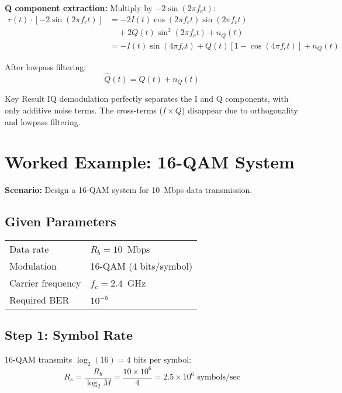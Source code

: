 \textbf{Q component extraction:} Multiply by $-2\sin(2\pi f_c t)$:
\begin{equation}
\begin{aligned}
r(t) \cdot [-2\sin(2\pi f_c t)] &= -2I(t)\cos(2\pi f_c t)\sin(2\pi f_c t) \\
&\quad + 2Q(t)\sin^2(2\pi f_c t) + n_Q(t) \\
&= -I(t)\sin(4\pi f_c t) + Q(t)[1 - \cos(4\pi f_c t)] + n_Q(t)
\end{aligned}
\end{equation}

After lowpass filtering:
\begin{equation}
\hat{Q}(t) = Q(t) + n_Q(t)
\end{equation}

\begin{calloutbox}{Key Result}
IQ demodulation perfectly separates the I and Q components, with only additive noise terms. The cross-terms ($I \times Q$) disappear due to orthogonality and lowpass filtering.
\end{calloutbox}

\section{Worked Example: 16-QAM System}

\textbf{Scenario:} Design a 16-QAM system for 10~Mbps data transmission.

\subsection*{Given Parameters}

\begin{tabular}{@{}ll@{}}
Data rate & $R_b = 10$~Mbps \\
Modulation & 16-QAM (4 bits/symbol) \\
Carrier frequency & $f_c = 2.4$~GHz \\
Required BER & $10^{-5}$ \\
\end{tabular}

\subsection*{Step 1: Symbol Rate}

16-QAM transmits $\log_2(16) = 4$ bits per symbol:
\begin{equation}
R_s = \frac{R_b}{\log_2 M} = \frac{10 \times 10^6}{4} = 2.5 \times 10^6 \text{ symbols/sec}
\end{equation}

